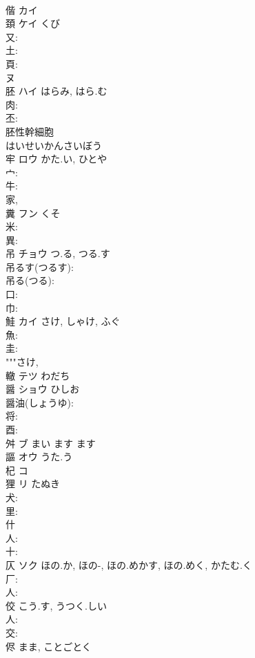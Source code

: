 \documentclass[8pt]{extreport}
\begin{document}
\begin{CJK}{UTF8}{min}
\\	偕	カイ			
\\	頚	ケイ	くび		
\\	又: 
\\	土: 
\\	頁: 
\\	ヌ
\\	胚	ハイ	はらみ, はら.む		
\\	肉: 
\\	丕: 
\\	胚性幹細胞　
\\	はいせいかんさいぼう　
\\	牢	ロウ	かた.い, ひとや		
\\	宀: 
\\	牛: 
\\	家, 
\\	糞	フン	くそ		
\\	米: 
\\	異: 
\\	吊	チョウ	つ.る, つる.す		
\\	吊るす(つるす): 
\\	吊る(つる): 
\\	口: 
\\	巾: 
\\	鮭	カイ	さけ, しゃけ, ふぐ		
\\	魚: 
\\	圭: 
\\	"""さけ, 
\\	轍	テツ わだち			
\\	醤	ショウ	ひしお		
\\	醤油(しょうゆ): 
\\	将: 
\\	酉: 
\\	舛	ブ まい ます ます			
\\	謳	オウ うた.う			
\\	杞	コ			
\\	狸	リ	たぬき		
\\	犬: 
\\	里: 
\\	什						
\\	人: 
\\	十: 
\\	仄	ソク	ほの.か, ほの-, ほの.めかす, ほの.めく, かたむ.く		
\\	厂: 
\\	人: 
\\	佼		こう.す, うつく.しい				
\\	人: 
\\	交: 
\\	侭		まま, ことごとく				

\end{CJK}
\end{document}
